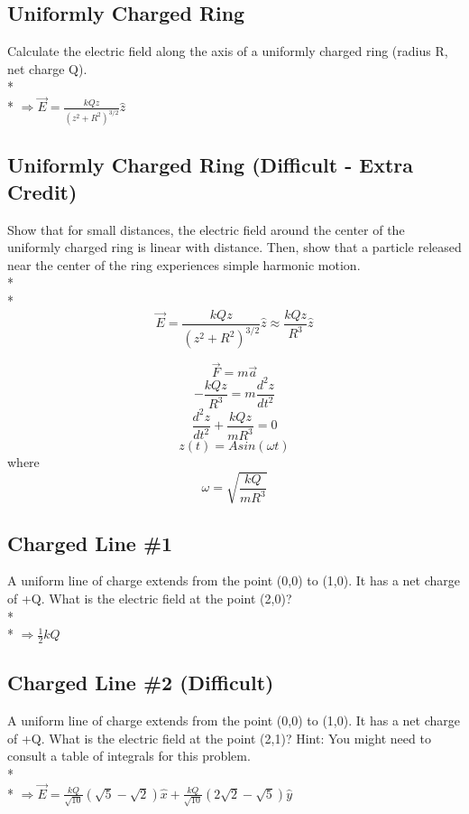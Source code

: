 \documentclass[11pt]{article}
\begin{document}
\subsection{Uniformly Charged Ring}
Calculate the electric field along the axis of a uniformly charged ring (radius R, net charge Q). \\* \\*
$\Rightarrow \vec{E} = \frac{kQz}{(z^2 + R^2)^{3/2}}\hat{z}$

\subsection{Uniformly Charged Ring (Difficult - Extra Credit)}
Show that for small distances, the electric field around the center of the uniformly charged ring is linear with distance.  Then, show that a particle released near the center of the ring experiences simple harmonic motion. \\* \\*
\begin{equation}
\vec{E} = \frac{kQz}{(z^2 + R^2)^{3/2}}\hat{z} \approx \frac{kQz}{R^3}\hat{z}
\end{equation}

\begin{equation}
\vec{F} = m \vec{a}
\end{equation}
\begin{equation}
-\frac{kQz}{R^3} = m\frac{d^2z}{dt^2}
\end{equation}
\begin{equation}
\frac{d^2z}{dt^2} + \frac{kQz}{mR^3} = 0
\end{equation}
\begin{equation}
z(t) = Asin(\omega t)
\end{equation}
where
\begin{equation}
\omega = \sqrt{\frac{kQ}{mR^3}}
\end{equation}

\pagebreak
\subsection{Charged Line \#1}
A uniform line of charge extends from the point (0,0) to (1,0).  It has a net charge of +Q.  What is the electric field at the point (2,0)? \\* \\*
$\Rightarrow \frac{1}{2}kQ$

\subsection{Charged Line \#2 (Difficult)}
A uniform line of charge extends from the point (0,0) to (1,0).  It has a net charge of +Q.  What is the electric field at the point (2,1)?  Hint: You might need to consult a table of integrals for this problem. \\* \\*
$\Rightarrow \vec{E} = \frac{kQ}{\sqrt{10}}(\sqrt{5} - \sqrt{2})\hat{x} + \frac{kQ}{\sqrt{10}}(2\sqrt{2} - \sqrt{5})\hat{y}$
\end{document}
